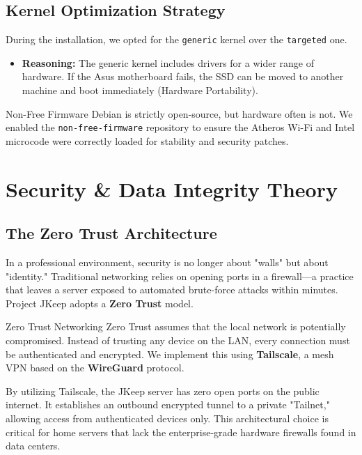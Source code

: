 \documentclass[12pt,a4paper,oneside]{book}
\begin{document}
\section{Kernel Optimization Strategy}
During the installation, we opted for the \texttt{generic} kernel over the \texttt{targeted} one.
\begin{itemize}
    \item \textbf{Reasoning:} The generic kernel includes drivers for a wider range of hardware. If the Asus motherboard fails, the SSD can be moved to another machine and boot immediately (Hardware Portability).
\end{itemize}

\begin{techwarning}{Non-Free Firmware}
Debian is strictly open-source, but hardware often is not. We enabled the \texttt{non-free-firmware} repository to ensure the Atheros Wi-Fi and Intel microcode were correctly loaded for stability and security patches.
\end{techwarning}

\chapter{Security \& Data Integrity Theory}

\section{The Zero Trust Architecture}
In a professional environment, security is no longer about "walls" but about "identity." Traditional networking relies on opening ports in a firewall—a practice that leaves a server exposed to automated brute-force attacks within minutes. Project JKeep adopts a \textbf{Zero Trust} model.

\begin{conceptbox}{Zero Trust Networking}
Zero Trust assumes that the local network is potentially compromised. Instead of trusting any device on the LAN, every connection must be authenticated and encrypted. We implement this using \textbf{Tailscale}, a mesh VPN based on the \textbf{WireGuard} protocol. 
\end{conceptbox}

By utilizing Tailscale, the JKeep server has zero open ports on the public internet. It establishes an outbound encrypted tunnel to a private "Tailnet," allowing access from authenticated devices only. This architectural choice is critical for home servers that lack the enterprise-grade hardware firewalls found in data centers.
\end{document}
